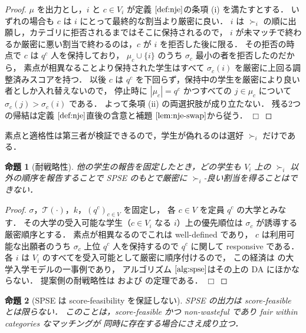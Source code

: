 \documentclass[
    12pt,          %
    a4paper,       %
    oneside,       %
    onecolumn,     %
    titlepage,     %
    final          %
]{jreport} %
\newcommand{\refdefinition}[1]{定義 $\ref{#1}$}
\newcommand{\reflemma}[1]{補題 $\ref{#1}$}
\newcommand{\refalgorithm}[1]{アルゴリズム $\ref{#1}$}
\newtheorem{proof}{証明}[chapter]
\newtheorem{proposition}{命題}[chapter]
\newcommand{\qed}{\hfill $\Box$ \par}
\renewcommand{\T}{\mathcal{T}}   %
\begin{document}
\begin{proof}
$\mu$ を出力とし，$i$ と $c\in V_i$ が\refdefinition{def:nje}の条項 (i) を満たすとする．
いずれの場合も $c$ は $i$ にとって最終的な割当より厳密に良い．
$i$ は $\succ_i$ の順に出願し，カテゴリに拒否されるまではそこに保持されるので，
$i$ が未マッチで終わるか厳密に悪い割当で終わるのは，$c$ が $i$ を拒否した後に限る．
その拒否の時点で $c$ は $q^c$ 人を保持しており，
$\mu_c\cup\{i\}$ のうち $\sigma_c$ 最小の者を拒否したのだから，
素点が相異なることより保持された学生はすべて $\sigma_c(i)$ を厳密に上回る調整済みスコアを持つ．
以後 $c$ は $q^c$ を下回らず，保持中の学生を厳密により良い者としか入れ替えないので，
停止時に $|\mu_c|=q^c$ かつすべての $j\in\mu_c$ について $\sigma_c(j)>\sigma_c(i)$ である．
よって条項 (ii) の両選択肢が成り立たない．
残る2つの帰結は\refdefinition{def:nje}直後の含意と\reflemma{lem:nje-swap}から従う．
\qed
\end{proof}

素点と適格性は第三者が検証できるので，学生が偽れるのは選好 $\succ_i$ だけである．

\begin{proposition}[耐戦略性]
\label{prop:spse-sp}
他の学生の報告を固定したとき，どの学生も $V_i$ 上の $\succ_i$ 以外の順序を報告することで
SPSE のもとで厳密に $\succ_i$-良い割当を得ることはできない．
\end{proposition}

\begin{proof}
$\sigma$，$\T(\cdot)$，$k$，$(q^c)_{c\in V}$ を固定し，
各 $c\in V$ を定員 $q^c$ の大学とみなす．
その大学の受入可能な学生（$c\in V_i$ なる $i$）上の優先順位は
$\sigma_c$ が誘導する厳密順序とする．
素点が相異なるのでこれは well-defined であり，
$c$ は利用可能な出願者のうち $\sigma_c$ 上位 $q^c$ 人を保持するので $q^c$ に関して responsive である．
各 $i$ は $V_i$ のすべてを受入可能として厳密に順序付けるので，
この経済は \citet{GaSh62a} の大学入学モデルの一事例であり，
\refalgorithm{alg:spse}はその上の DA にほかならない．
提案側の耐戦略性は \citet{DuFr81a} および \citet{Roth82a} の定理である．
\qed
\end{proof}

\begin{proposition}[SPSE は score-feasibility を保証しない]
\label{prop:spse-not-sf}
SPSE の出力は score-feasible とは限らない．
このことは，score-feasible かつ non-wasteful であり fair within categories なマッチングが
同時に存在する場合にさえ成り立つ．
\end{proposition}
\end{document}
